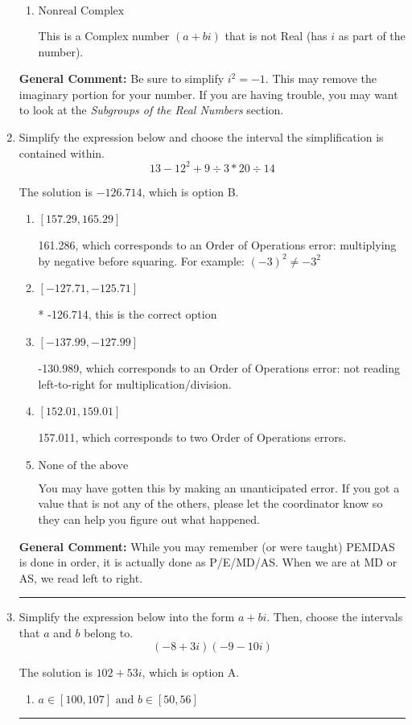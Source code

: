 \documentclass{extbook}[14pt]
\newcommand{\litem}[1]{\item #1

\rule{\textwidth}{0.4pt}}
\begin{document}
\begin{enumerate}
{\begin{enumerate}[label=\Alph*.]
These cannot be written as a fraction of Integers. Remember: $\pi$ is not an Integer!
\item \( \text{Nonreal Complex} \)

This is a Complex number $(a+bi)$ that is not Real (has $i$ as part of the number).
\end{enumerate}

\textbf{General Comment:} Be sure to simplify $i^2 = -1$. This may remove the imaginary portion for your number. If you are having trouble, you may want to look at the \textit{Subgroups of the Real Numbers} section.
}
\litem{
Simplify the expression below and choose the interval the simplification is contained within.
\[ 13 - 12^2 + 9 \div 3 * 20 \div 14 \]

The solution is \( -126.714 \), which is option B.\begin{enumerate}[label=\Alph*.]
\item \( [157.29, 165.29] \)

 161.286, which corresponds to an Order of Operations error: multiplying by negative before squaring. For example: $(-3)^2 \neq -3^2$
\item \( [-127.71, -125.71] \)

* -126.714, this is the correct option
\item \( [-137.99, -127.99] \)

 -130.989, which corresponds to an Order of Operations error: not reading left-to-right for multiplication/division.
\item \( [152.01, 159.01] \)

 157.011, which corresponds to two Order of Operations errors.
\item \( \text{None of the above} \)

 You may have gotten this by making an unanticipated error. If you got a value that is not any of the others, please let the coordinator know so they can help you figure out what happened.
\end{enumerate}

\textbf{General Comment:} While you may remember (or were taught) PEMDAS is done in order, it is actually done as P/E/MD/AS. When we are at MD or AS, we read left to right.
}
\litem{
Simplify the expression below into the form $a+bi$. Then, choose the intervals that $a$ and $b$ belong to.
\[ (-8 + 3 i)(-9 - 10 i) \]

The solution is \( 102 + 53 i \), which is option A.\begin{enumerate}[label=\Alph*.]
\item \( a \in [100, 107] \text{ and } b \in [50, 56] \)


\end{enumerate}}
\end{enumerate}
\end{document}
